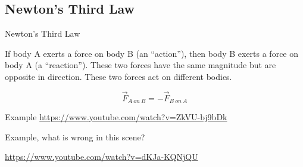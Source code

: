 \documentclass[]{beamer}
\begin{document}

\subsection{ Newton’s Third Law}

    \begin{frame}
      Newton’s Third Law
      \vspace{5mm}
    
      If body A exerts a force on body B (an
      “action”), then body B exerts a force on body A (a “reaction”). These two forces
      have the same magnitude but are opposite in direction. These two forces act on
      different bodies.
    
      \begin{equation}
        \vec{F}_{A~ on ~ B}=-\vec{F}_{B~ on ~ A}
      \end{equation}
    
      \vspace{5mm}

      Example \url{https://www.youtube.com/watch?v=ZkVU-bj9bDk}



      \end{frame}




  \begin{frame}
  

    Example, what is wrong in this scene?
    
    
    \url{https://www.youtube.com/watch?v=dKJa-KQNjQU}



    \end{frame}


  
\end{document}
